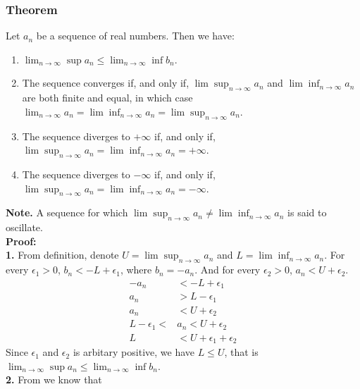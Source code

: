 \documentclass[12pt]{article}
\begin{document}
\subsubsection{Theorem}
Let $a_{n}$ be a sequence of real numbers. Then we have:
\begin{enumerate}
    \item $\lim_{n\rightarrow \infty}\sup a_{n}\leq\lim_{n\rightarrow \infty}\inf b_{n}$.
    \item The sequence converges if, and only if, $\lim\sup_{n\rightarrow \infty}a_{n}$ and 
    $\lim\inf_{n\rightarrow \infty}a_{n}$ are both finite and equal, in which case 
    $\lim_{n\rightarrow \infty}a_{n}=\lim\inf_{n\rightarrow \infty}a_{n}=\lim\sup_{n\rightarrow \infty}a_{n}$.
    \item The sequence diverges to $+\infty$ if, and only if, $\lim\sup_{n\rightarrow \infty}a_{n}=\lim\inf_{n\rightarrow \infty}a_{n}=+\infty$.
    \item The sequence diverges to $-\infty$ if, and only if, $\lim\sup_{n\rightarrow \infty}a_{n}=\lim\inf_{n\rightarrow \infty}a_{n}=-\infty$.
\end{enumerate}
\textbf{Note.} A sequence for which $\lim\sup_{n\rightarrow \infty}a_{n}\neq\lim\inf_{n\rightarrow \infty}a_{n} $ is said to oscillate.\\
\textbf{Proof:}\\
\textbf{1.}
From definition, denote $U=\lim\sup_{n\rightarrow \infty}a_{n}$ and $L=\lim\inf_{n\rightarrow \infty}a_{n}$.
For every $\epsilon_{1}>0$, $b_{n}<-L+\epsilon_{1}$, where $b_{n}=-a_{n}$. And for every $\epsilon_{2}>0$, $a_{n}<U+\epsilon_{2}$.
\begin{align*}
    -a_{n} &< -L + \epsilon_{1} \\
    a_{n} &> L - \epsilon_{1} \\
    a_{n} &< U + \epsilon_{2} \\
    L - \epsilon_{1} < &a_{n} < U + \epsilon_{2} \\
    L &< U + \epsilon_{1} + \epsilon_{2}
\end{align*}
Since $\epsilon_{1}$ and $\epsilon_{2}$ is arbitary positive, 
we have $L\leq U$, that is $\lim_{n\rightarrow \infty}\sup a_{n}\leq\lim_{n\rightarrow \infty}\inf b_{n}$.\\
\textbf{2.}
From  we know that 
\end{document}

